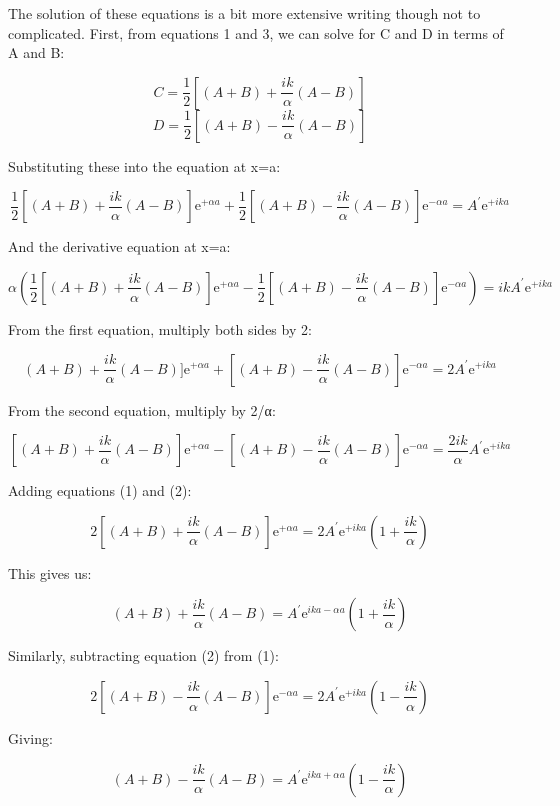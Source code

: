 \documentclass[
  a4paper,
]{book}
\begin{document}
\begin{tcolorbox}[enhanced jigsaw, coltitle=black, title=\textcolor{quarto-callout-note-color}{\faInfo}\hspace{0.5em}{Solving the equations}, colframe=quarto-callout-note-color-frame, toprule=.15mm, opacitybacktitle=0.6, left=2mm, opacityback=0, breakable, toptitle=1mm, bottomtitle=1mm, leftrule=.75mm, arc=.35mm, titlerule=0mm, colbacktitle=quarto-callout-note-color!10!white, rightrule=.15mm, bottomrule=.15mm, colback=white]

The solution of these equations is a bit more extensive writing though
not to complicated. First, from equations 1 and 3, we can solve for C
and D in terms of A and B:

\[C = \frac{1}{2}\left[(A+B) + \frac{ik}{\alpha}(A-B)\right]\]
\[D = \frac{1}{2}\left[(A+B) - \frac{ik}{\alpha}(A-B)\right]\]

Substituting these into the equation at x=a:

\[\frac{1}{2}\left[(A+B) + \frac{ik}{\alpha}(A-B)\right]\mathrm{e}^{+ \alpha a} + \frac{1}{2}\left[(A+B) - \frac{ik}{\alpha}(A-B)\right]\mathrm{e}^{- \alpha a} = A^{\prime} \mathrm{e}^{+ i k a}\]

And the derivative equation at x=a:

\[\alpha \left(\frac{1}{2}\left[(A+B) + \frac{ik}{\alpha}(A-B)\right]\mathrm{e}^{+ \alpha a} - \frac{1}{2}\left[(A+B) - \frac{ik}{\alpha}(A-B)\right]\mathrm{e}^{- \alpha a}\right) = i k A^{\prime} \mathrm{e}^{+ i k a}\]

From the first equation, multiply both sides by 2:

\[(A+B) + \frac{ik}{\alpha}(A-B)]\mathrm{e}^{+ \alpha a} + [(A+B) - \frac{ik}{\alpha}(A-B)]\mathrm{e}^{- \alpha a} = 2A^{\prime} \mathrm{e}^{+ i k a} \tag{1}\]

From the second equation, multiply by 2/α:

\[[(A+B) + \frac{ik}{\alpha}(A-B)]\mathrm{e}^{+ \alpha a} - [(A+B) - \frac{ik}{\alpha}(A-B)]\mathrm{e}^{- \alpha a} = \frac{2ik}{\alpha} A^{\prime} \mathrm{e}^{+ i k a} \tag{2}\]

Adding equations (1) and (2):

\[2[(A+B) + \frac{ik}{\alpha}(A-B)]\mathrm{e}^{+ \alpha a} = 2A^{\prime} \mathrm{e}^{+ i k a}(1 + \frac{ik}{\alpha})\]

This gives us:

\[(A+B) + \frac{ik}{\alpha}(A-B) = A^{\prime} \mathrm{e}^{i k a - \alpha a}(1 + \frac{ik}{\alpha}) \tag{3}\]

Similarly, subtracting equation (2) from (1):

\[2[(A+B) - \frac{ik}{\alpha}(A-B)]\mathrm{e}^{- \alpha a} = 2A^{\prime} \mathrm{e}^{+ i k a}(1 - \frac{ik}{\alpha})\]

Giving:

\[(A+B) - \frac{ik}{\alpha}(A-B) = A^{\prime} \mathrm{e}^{i k a + \alpha a}(1 - \frac{ik}{\alpha}) \tag{4}\]

\end{tcolorbox}
\end{document}
